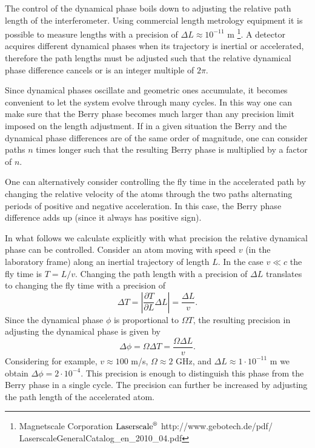 The control of the dynamical phase boils down to adjusting the relative path length of the interferometer.  Using commercial length metrology equipment it is possible to measure lengths with a precision of $\Delta L\approx 10^{-11}$ m  \footnote{Magnetscale Corporation $\text{Laserscale}^{\text{\textregistered}}$ http://www.gebotech.de/pdf/\\LaserscaleGeneralCatalog\_en\_2010\_04.pdf }.  A detector acquires different dynamical phases when its trajectory is  inertial or accelerated,  therefore the path lengths must be adjusted such that the relative dynamical phase difference cancels or is an integer multiple of $2\pi$.

Since dynamical phases oscillate and geometric ones accumulate, it becomes convenient to let the system evolve through many cycles.  In this way one can make sure that the Berry phase becomes much larger than any precision limit imposed on the length adjustment. If in a given situation the Berry and the dynamical phase differences are of the same order of magnitude, one can consider paths $n$ times longer such that the resulting Berry phase is multiplied by a factor of $n$. 

One can alternatively consider controlling the fly time in the accelerated path by changing the relative velocity of the atoms through the two paths  alternating periods of positive and negative acceleration. In this case, the Berry phase difference adds up (since it always has positive sign). 

In what follows we calculate explicitly with what precision the relative dynamical phase can be controlled.  Consider an atom moving with speed  $v$ (in the laboratory frame) along an inertial trajectory of length $L$. In the case $v\ll c$  the fly time is
$T=L/v$. Changing the path length with a precision of  $\Delta L$ translates to changing the fly time with a precision of
\[\Delta T = \left|\frac{\partial T}{\partial L}\Delta L\right|=\frac{\Delta L}{v}.\]
Since the dynamical phase $\phi$ is proportional to
$\Omega T$,
the resulting precision in adjusting the dynamical phase  is given by
\[\Delta \phi=\Omega \Delta T=\frac{\Omega \Delta L}{v}.\]
Considering for example, $v\approx 100$ m/s, $\Omega\approx 2$ GHz, and  $\Delta L\approx 1 \cdot 10^{-11}$ m we obtain $\Delta \phi=2\cdot10^{-4}$. This precision is enough to distinguish this phase from the Berry phase in a single cycle. The precision can further be increased by adjusting the path length of the accelerated atom.

